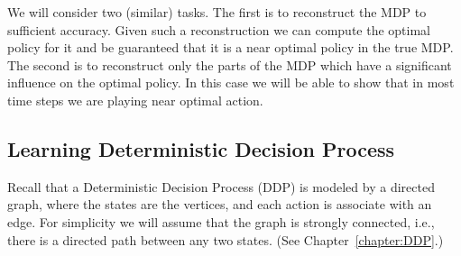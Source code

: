 We will consider two (similar) tasks. The first is to reconstruct
the MDP to sufficient accuracy. Given such a reconstruction we can
compute the optimal policy for it and be guaranteed that it is a
near optimal policy in the true MDP. The second is to reconstruct
only the parts of the MDP which have a significant influence on the
optimal policy. In this case we will be able to show that in most
time steps we are playing near optimal action.

\subsection{Learning Deterministic Decision Process}

Recall that a Deterministic Decision Process (DDP) is modeled by a
directed graph, where the states are the vertices, and each action
is associate with an edge. For simplicity we will assume that the
graph is strongly connected, i.e., there is a directed path between
any two states. (See Chapter~\ref{chapter:DDP}.)

%
%
%
%
%
%
%

